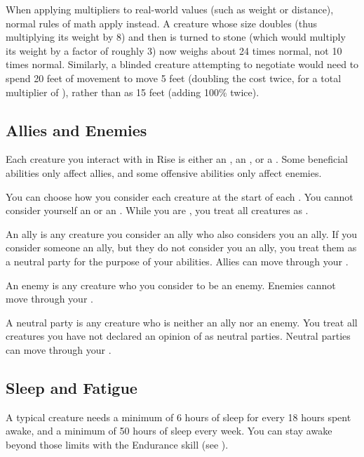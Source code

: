             When applying multipliers to real-world values (such as weight or distance), normal rules of math apply instead.
            A creature whose size doubles (thus multiplying its weight by 8) and then is turned to stone (which would multiply its weight by a factor of roughly 3) now weighs about 24 times normal, not 10 times normal.
            Similarly, a blinded creature attempting to negotiate  would need to spend 20 feet of movement to move 5 feet (doubling the cost twice, for a total multiplier of ), rather than as 15 feet (adding 100\% twice).

    \subsection{Allies and Enemies}\label{Allies and Enemies}
        Each creature you interact with in Rise is either an , an , or a .
        Some beneficial abilities only affect allies, and some offensive abilities only affect enemies.

        You can choose how you consider each creature at the start of each .
        You cannot consider yourself an  or an .
        While you are , you treat all creatures as .

         An ally is any creature you consider an ally who also considers you an ally.
        If you consider someone an ally, but they do not consider you an ally, you treat them as a neutral party for the purpose of your abilities.
        Allies can move through your .

         An enemy is any creature who you consider to be an enemy.
        Enemies cannot move through your .

         A neutral party is any creature who is neither an ally nor an enemy.
        You treat all creatures you have not declared an opinion of as neutral parties.
        Neutral parties can move through your .

    \subsection{Sleep and Fatigue}\label{Sleep and Fatigue}
        A typical creature needs a minimum of 6 hours of sleep for every 18 hours spent awake, and a minimum of 50 hours of sleep every week.
        You can stay awake beyond those limits with the Endurance skill (see ).


